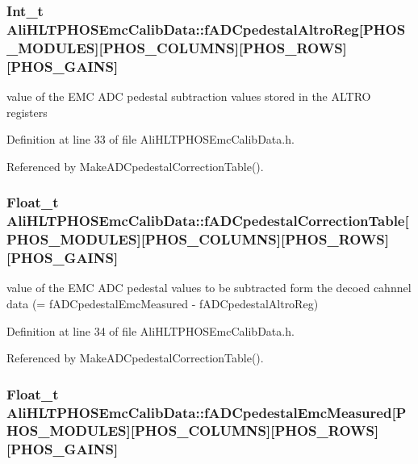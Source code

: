 \subsubsection{\setlength{\rightskip}{0pt plus 5cm}Int\_\-t {\bf Ali\-HLTPHOSEmc\-Calib\-Data::f\-ADCpedestal\-Altro\-Reg}[PHOS\_\-MODULES][PHOS\_\-COLUMNS][PHOS\_\-ROWS][PHOS\_\-GAINS]\hspace{0.3cm}{\tt  [protected]}}\label{classAliHLTPHOSEmcCalibData_AliHLTPHOSEmcCalibDatap2}


value of the EMC ADC pedestal subtraction values stored in the ALTRO registers 

Definition at line 33 of file Ali\-HLTPHOSEmc\-Calib\-Data.h.

Referenced by Make\-ADCpedestal\-Correction\-Table().
\subsubsection{\setlength{\rightskip}{0pt plus 5cm}Float\_\-t {\bf Ali\-HLTPHOSEmc\-Calib\-Data::f\-ADCpedestal\-Correction\-Table}[PHOS\_\-MODULES][PHOS\_\-COLUMNS][PHOS\_\-ROWS][PHOS\_\-GAINS]\hspace{0.3cm}{\tt  [protected]}}\label{classAliHLTPHOSEmcCalibData_AliHLTPHOSEmcCalibDatap3}


value of the EMC ADC pedestal values to be subtracted form the decoed cahnnel data (= f\-ADCpedestal\-Emc\-Measured - f\-ADCpedestal\-Altro\-Reg) 

Definition at line 34 of file Ali\-HLTPHOSEmc\-Calib\-Data.h.

Referenced by Make\-ADCpedestal\-Correction\-Table().
\subsubsection{\setlength{\rightskip}{0pt plus 5cm}Float\_\-t {\bf Ali\-HLTPHOSEmc\-Calib\-Data::f\-ADCpedestal\-Emc\-Measured}[PHOS\_\-MODULES][PHOS\_\-COLUMNS][PHOS\_\-ROWS][PHOS\_\-GAINS]\hspace{0.3cm}{\tt  [protected]}}\label{classAliHLTPHOSEmcCalibData_AliHLTPHOSEmcCalibDatap1}


